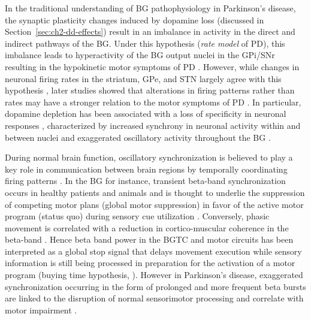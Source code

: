 In the traditional understanding of BG pathophysiology in Parkinson's disease,
the synaptic plasticity changes induced by dopamine loss (discussed in Section~\ref{sec:ch2-dd-effects})
result in an imbalance in activity in the direct and indirect pathways of the BG.
Under this hypothesis (\textit{rate model} of PD), this imbalance leads to hyperactivity
of the BG output nuclei in the GPi/SNr resulting in the hypokinetic motor symptoms
of PD \cite{delong_primate_1990,albin_functional_1989}.
%
However, while changes in neuronal firing rates in the striatum, GPe, and STN largely
agree with this hypothesis \cite{galvan_alterations_2015}, later studies showed that
alterations in firing patterns rather than rates may have a stronger relation to the
motor symptoms of PD \cite{levy_high-frequency_2000,brown_dopamine_2001,brown_abnormal_2007,sanders_parkinsonism-related_2013,sharott_activity_2014,pan_neuronal_2016,kita_cortical_2011}.
In particular, dopamine depletion has been associated
with a loss of specificity in neuronal responses \cite{bronfeld_loss_2011},
characterized by increased synchrony in neuronal activity within and between nuclei \cite{bergman_physiological_1998,dostrovsky_oscillatory_2004,bronte-stewart_stn_2009,hammond_pathological_2007,levy_high-frequency_2000,heimer_dopamine_2002} and exaggerated oscillatory activity
throughout the BG \cite{sharott_dopamine_2005,mallet_disrupted_2008,kuhn_high-frequency_2008,brown_dopamine_2001,brown_abnormal_2007}.

During normal brain function, oscillatory synchronization is believed to play
a key role in communication between brain regions by temporally coordinating firing patterns
\cite{engel_dynamic_2001,womelsdorf_modulation_2007}. In the BG for instance,
transient beta-band synchronization occurs in healthy patients and animals
\cite{pfurtscheller_post-movement_1996,leventhal_basal_2012,wessel_stop-related_2016,lipski_dynamics_2017,khanna_beta_2017}
and is thought to underlie the suppression of competing motor plans (global motor suppression)
in favor of the active motor program (status quo) during sensory cue utilization
\cite{gilbertson_existing_2005,leventhal_basal_2012,feingold_bursts_2015}.
Conversely, phasic movement is correlated with a reduction in cortico-muscular coherence
in the beta-band \cite{brown_cortical_1998}. Hence beta band power in the BGTC and motor circuits
has been interpreted as a global stop signal that delays movement execution while sensory
information is still being processed in preparation for the activation of a motor program
(buying time hypothesis, \cite{frank_hold_2006}).
However in Parkinson's disease, exaggerated synchronization occurring in the form
of prolonged and more frequent beta bursts are linked to the disruption of normal
sensorimotor processing and correlate with motor impairment \cite{tinkhauser_modulatory_2017,tinkhauser_beta_2017}.
%

